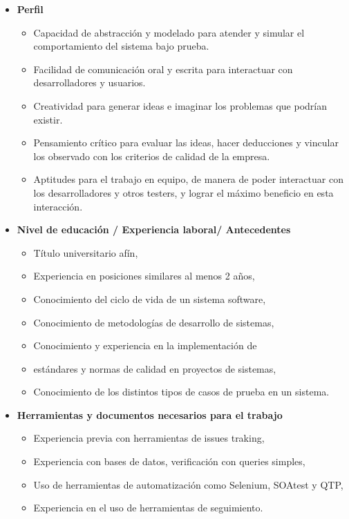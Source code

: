 \begin{itemize}
            \item \textbf{Perfil}
            \begin{itemize}
				\item Capacidad de abstracción y modelado para atender y simular el comportamiento del sistema bajo prueba.
                \item Facilidad de comunicación oral y escrita para interactuar con desarrolladores y usuarios.
                \item Creatividad para generar ideas e imaginar los problemas que podrían existir.
                \item Pensamiento crítico para evaluar las ideas, hacer deducciones y vincular los observado con los criterios de calidad de la empresa.
                \item Aptitudes para el trabajo en equipo, de manera de poder interactuar con los desarrolladores y otros testers, y lograr el máximo beneficio en esta interacción.
            \end{itemize}
            \item \textbf{Nivel de educación / Experiencia laboral/ Antecedentes}
                \begin{itemize}
                    \item Título universitario afín, 
					\item Experiencia en posiciones similares al menos 2 años,
					\item Conocimiento del ciclo de vida de un sistema software, 
					\item Conocimiento de metodologías de desarrollo de sistemas, 
					\item Conocimiento y experiencia en la implementación de 							\item estándares y normas de calidad en proyectos de sistemas, 
					\item Conocimiento de los distintos tipos de casos de prueba en un sistema.
                \end{itemize}
            \item \textbf{Herramientas y documentos necesarios para el trabajo}
            	\begin{itemize}
                    \item Experiencia previa con herramientas de issues traking,
					\item Experiencia con bases de datos, verificación con queries simples,
					\item Uso de herramientas de automatización como Selenium, SOAtest y QTP,
					\item Experiencia en el uso de herramientas de seguimiento.
                \end{itemize}
			\end{itemize}    
    
